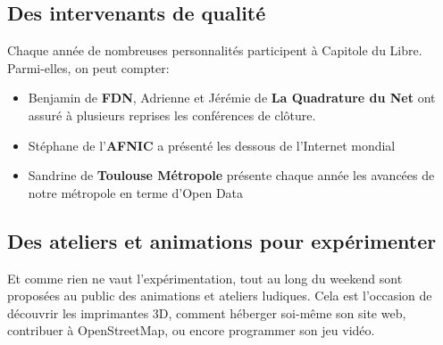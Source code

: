 \subsection{Des intervenants de qualité}

Chaque année de nombreuses personnalités participent à Capitole du Libre. Parmi-elles, on peut compter:

\begin{itemize}[label=$\bullet$]
\item Benjamin  de \textbf{FDN}, Adrienne  et Jérémie  de \textbf{La Quadrature du Net} ont assuré à plusieurs reprises les conférences de clôture.
\item Stéphane  de l'\textbf{AFNIC} a présenté les dessous de l'Internet mondial
\item Sandrine  de \textbf{Toulouse Métropole} présente chaque année les avancées de notre métropole en terme d'Open Data
\end{itemize} 

\subsection{Des ateliers et animations pour expérimenter}


\begin{minipage}{0.6\textwidth}
Et comme rien ne vaut l'expérimentation, tout au long du weekend sont 
proposées au public des animations et ateliers ludiques. Cela est 
l'occasion de découvrir les imprimantes 3D, comment héberger soi-même son 
site web, contribuer à OpenStreetMap, ou encore programmer son jeu vidéo.
\end{minipage}
\begin{minipage}{0.4\textwidth}
\end{minipage}

